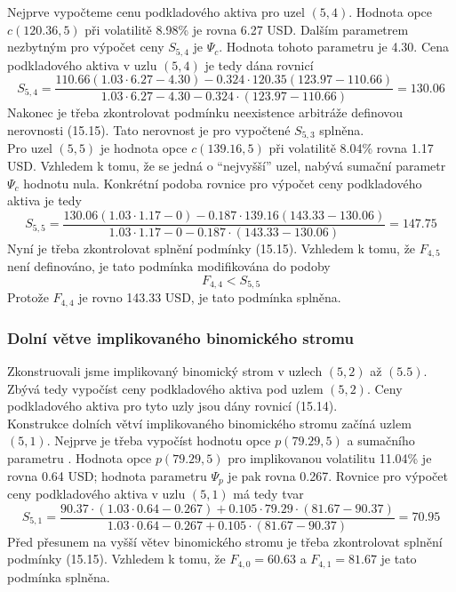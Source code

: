 \documentclass[a4paper]{book}
\begin{document}
Nejprve vypočteme cenu podkladového aktiva pro uzel $(5,4)$. Hodnota opce $c(120.36,5)$ při volatilitě 8.98\% je rovna 6.27 USD. Dalším parametrem nezbytným pro výpočet ceny $S_{5,4}$ je $\Psi_c$. Hodnota tohoto parametru je 4.30. Cena podkladového aktiva v uzlu $(5,4)$ je tedy dána rovnicí
\begin{equation*}
S_{5,4} = \frac{110.66(1.03 \cdot 6.27 - 4.30) - 0.324 \cdot 120.35(123.97 - 110.66)}{1.03 \cdot 6.27 - 4.30 - 0.324 \cdot(123.97 - 110.66)} = 130.06
\end{equation*}
Nakonec je třeba zkontrolovat podmínku neexistence arbitráže definovou nerovnosti (15.15). Tato nerovnost je pro vypočtené $S_{5,3}$ splněna.\\

Pro uzel $(5,5)$ je hodnota opce $c(139.16,5)$ při volatilitě 8.04\% rovna 1.17 USD. Vzhledem k tomu, že se jedná o ``nejvyšší'' uzel, nabývá sumační parametr $\Psi_c$ hodnotu nula. Konkrétní podoba rovnice pro výpočet ceny podkladového aktiva je tedy
 \begin{equation*}
S_{5,5} = \frac{130.06(1.03 \cdot 1.17 - 0) - 0.187 \cdot 139.16(143.33 - 130.06)}{1.03 \cdot 1.17 - 0 - 0.187 \cdot(143.33 - 130.06)} = 147.75
\end{equation*}
Nyní je třeba zkontrolovat splnění podmínky (15.15). Vzhledem k tomu, že $F_{4,5}$ není definováno, je tato podmínka modifikována do podoby
\begin{equation*}
F_{4,4} < S_{5,5}
\end{equation*}
Protože $F_{4,4}$ je rovno 143.33 USD, je tato podmínka splněna.

\subsubsection{Dolní větve implikovaného binomického stromu}

Zkonstruovali jsme implikovaný binomický strom v uzlech $(5,2)$ až $(5.5)$. Zbývá tedy vypočíst ceny podkladového aktiva pod uzlem $(5,2)$. Ceny podkladového aktiva pro tyto uzly jsou dány rovnicí (15.14).\\

Konstrukce dolních větví implikovaného binomického stromu začíná uzlem $(5,1)$. Nejprve je třeba vypočíst hodnotu opce $p(79.29,5)$ a sumačního parametru  . Hodnota opce $p(79.29,5)$ pro implikovanou volatilitu 11.04\% je rovna 0.64 USD; hodnota parametru $\Psi_p$ je pak rovna 0.267. Rovnice pro výpočet ceny podkladového aktiva v uzlu $(5,1)$ má tedy tvar
\begin{equation*}
S_{5,1} = \frac{90.37 \cdot(1.03 \cdot 0.64 - 0.267) + 0.105 \cdot 79.29 \cdot(81.67 - 90.37)}{1.03 \cdot 0.64 - 0.267 + 0.105 \cdot(81.67 - 90.37)} = 70.95
\end{equation*}
Před přesunem na vyšší větev binomického stromu je třeba zkontrolovat splnění podmínky (15.15). Vzhledem k tomu, že $F_{4,0} = 60.63$ a $F_{4,1}=81.67$ je tato podmínka splněna.\\
\end{document}

